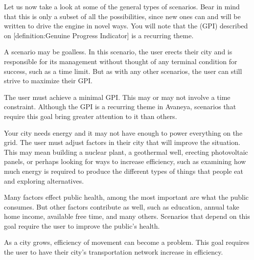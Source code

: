 Let us now take a look at some of the general types of scenarios. Bear in mind that this is only a subset of all the possibilities, since new ones can and will be written to drive the engine in novel ways. You will note that the  (GPI) described on [definition:Genuine Progress Indicator] is a recurring theme.

\startitemize[4]
\setupwhitespace[big]

A scenario may be goalless. In this scenario, the user erects their city and is responsible for its management without thought of any terminal condition for success, such as a time limit. But as with any other scenarios, the user can still strive to maximize their GPI.


The user must achieve a minimal GPI. This may or may not involve a time constraint. Although the GPI is a recurring theme in Avaneya, scenarios that require this goal bring greater attention to it than others.




Your city needs energy and it may not have enough to power everything on the grid. The user must adjust factors in their city that will improve the situation. This may mean building a nuclear plant, a geothermal well, erecting photovoltaic panels, or perhaps looking for ways to increase efficiency, such as examining how much energy is required to produce the different types of things that people eat and exploring alternatives.


Many factors effect public health, among the most important are what the public consumes. But other factors contribute as well, such as education, annual take home income, available free time, and many others. Scenarios that depend on this goal require the user to improve the public's health.


As a city grows, efficiency of movement can become a problem. This goal requires the user to have their city's transportation network increase in efficiency.

